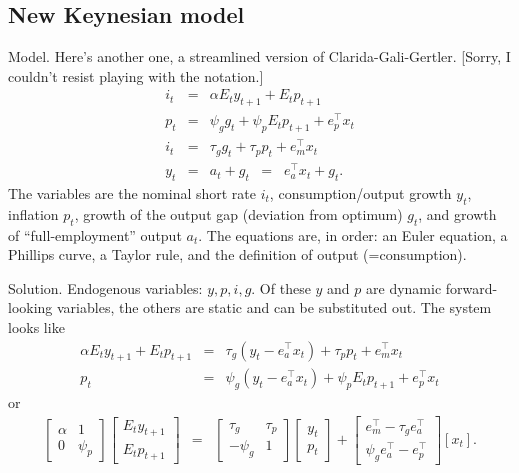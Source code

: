 \documentclass[11pt]{article}
\begin{document}
\subsection*{New Keynesian model}

Model.  
Here's another one, a streamlined version of 
Clarida-Gali-Gertler.
[Sorry, I couldn't resist playing with the notation.]  
\begin{eqnarray*}
    i_t &=& \alpha E_t y_{t+1} + E_t p_{t+1}  \\
    p_t &=& \psi_g g_t + \psi_p E_t p_{t+1} + e_p^\top x_t  \\
    i_t &=& \tau_g g_t + \tau_p p_t + e_m^\top x_t \\
    y_{t} &=& a_t + g_{t} \;\;=\;\; e_a^\top x_t + g_t .  
\end{eqnarray*}
The variables are the nominal short rate $i_t$, 
consumption/output growth $y_t$, 
inflation $p_t$, 
growth of the output gap (deviation from optimum) $g_t$, 
and growth of ``full-employment'' output $a_t$.  
The equations are, in order:  
an Euler equation, a Phillips curve, 
a Taylor rule, and the definition of output (=consumption).  

Solution.  
Endogenous variables:  $y, p, i, g$.  
Of these $y$ and $p$ are dynamic forward-looking variables, 
the others are static and can be substituted out.  
The system looks like 
\begin{eqnarray*}
    \alpha E_t y_{t+1} + E_t p_{t+1} &=& \tau_g (y_t - e_a^\top x_t) 
                + \tau_p p_t + e_m^\top x_t \\
    p_t &=& \psi_g (y_t -e_a^\top x_t) + \psi_p E_t p_{t+1} + e_p^\top x_t 
\end{eqnarray*}
or 
\begin{eqnarray*}
    \left[
        \begin{array}{cc} 
            \alpha  &  1  \\  0 & \psi_p  
        \end{array}
    \right]
    \left[
        \begin{array}{c} 
            E_t y_{t+1} \\ E_t p_{t+1}  
        \end{array}
    \right]
    &=& 
    \left[
        \begin{array}{cc} 
            \tau_g & \tau_p  \\  -\psi_g & 1   
        \end{array}
    \right]
    \left[
        \begin{array}{c} 
            y_{t} \\ p_{t}  
        \end{array}
    \right]
    + 
    \left[
        \begin{array}{c} 
           e_m^\top - \tau_g e_a^\top \\
           \psi_g e_a^\top - e_p^\top   
        \end{array}
    \right]
    \left[  x_t \right] .
\end{eqnarray*}
\end{document}
